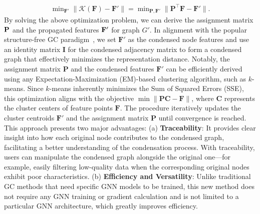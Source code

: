 \begin{equation}
    \begin{aligned}
         \min\nolimits_{\mathbf{F}'} \|\mathcal{K}(\mathbf{F}) - \mathbf{F}'\|
        = \min\nolimits_{\mathbf{P},\mathbf{F}'} \| \mathbf{P}^\top \mathbf{F} - \mathbf{F}' \|.
    \end{aligned}
    \label{eq:representation_distance}
\end{equation}
By solving the above optimization problem, we can derive the assignment matrix ${\bf P}$ and the propagated features ${\bf F}'$ for graph $G'$. In alignment with the popular structure-free GC paradigm~\cite{geom, sfgc, jin2021graph}, we set $\mathbf{F}'$ as the condensed node features and use an identity matrix $\mathbf{I}$ for the condensed adjacency matrix to form a condensed graph that effectively minimizes the representation distance. Notably, the assignment matrix $\mathbf{P}$ and the condensed features $\mathbf{F}'$ can be efficiently derived using any Expectation-Maximization (EM)-based clustering algorithm, such as $k$-means. Since $k$-means inherently minimizes the Sum of Squared Errors (SSE), this optimization aligns with the objective $\min \|\mathbf{P} \mathbf{C} - \mathbf{F}\|$,
where $\mathbf{C}$ represents the cluster centers of feature points $\mathbf{F}$. The procedure iteratively updates the cluster centroids $\mathbf{F}'$ and the assignment matrix $\mathbf{P}$ until convergence is reached. This approach presents two major advantages: (a) \textbf{Traceability}: It provides clear insight into how each original node contributes to the condensed graph, facilitating a better understanding of the condensation process. With traceability, users can manipulate the condensed graph alongside the original one—for example, easily filtering low-quality data when the corresponding original nodes exhibit poor characteristics.
(b) \textbf{Efficiency and Versatility}: Unlike traditional GC methods that need specific GNN models to be trained, this new method does not require any GNN training or gradient calculation and is not limited to a particular GNN architecture, which greatly improves efficiency.



